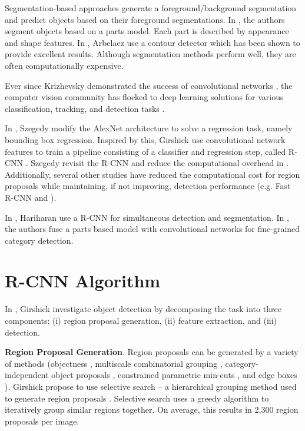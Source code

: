 \documentclass[10pt,twocolumn,letterpaper]{article}
\begin{document}
Segmentation-based approaches generate a foreground/background segmentation and predict objects based on their foreground segmentations. In \cite{gu2009recognition}, the authors segment objects based on a parts model. Each part is described by appearance and shape features. In \cite{arbelaez2011contour}, Arbelaez \etal use a contour detector which has been shown to provide excellent results. Although segmentation methods perform well, they are often computationally expensive.


Ever since Krizhevsky \etal demonstrated the success of convolutional networks \cite{krizhevsky2012imagenet}, the computer vision community has flocked to deep learning solutions for various classification, tracking, and detection tasks \cite{sermanet2013overfeat, ouyang2014deepid, iandola2014densenet, erhan2014scalable}. 

In \cite{szegedy2013deep}, Szegedy \etal modify the AlexNet architecture to solve a regression task, namely bounding box regression. Inspired by this, Girshick \etal use convolutional network features to train a pipeline consisting of a classifier and regression step, called R-CNN \cite{girshick2014rich}.  Szegedy \etal revisit the R-CNN and reduce the computational overhead in \cite{szegedy2014scalable}. Additionally, several other studies have reduced the computational cost for region proposals while maintaining, if not improving, detection performance (e.g. Fast R-CNN \cite{girshick2015fast} and \cite{szegedy2014scalable}).

In \cite{hariharan2014simultaneous}, Hariharan \etal use a R-CNN for simultaneous detection and segmentation. In \cite{zhang2014part}, the authors fuse a parts based model with convolutional networks for fine-grained category detection. 

\section{R-CNN Algorithm}


In \cite{girshick2014rich}, Girshick \etal investigate object detection by decomposing the task into three components: (i) region proposal generation, (ii) feature extraction, and (iii) detection.

\textbf{Region Proposal Generation}. Region proposals can be generated by a variety of methods (\eg objectness \cite{alexe2012measuring}, multiscale combinatorial grouping \cite{arbelaez2014multiscale}, category-independent object proposals \cite{endres2010category}, constrained parametric min-cuts \cite{carreira2012cpmc}, and edge boxes \cite{zitnick2014edge}). Girshick \etal propose to use selective search -- a hierarchical grouping method used to generate region proposals \cite{uijlings2013selective}. Selective search uses a greedy algorithm to iteratively group similar regions together. On average, this results in 2,300 region proposals per image.
\end{document}
